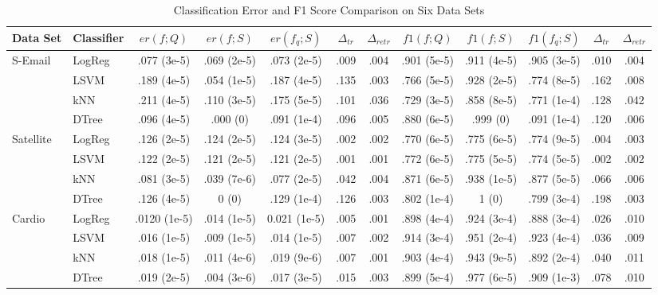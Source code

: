 \documentclass[10pt,a4paper,conference]{IEEEtran}
\begin{document}
\begin{table*}[t!]
\renewcommand{\arraystretch}{1.3} 
\caption{Classification Error and F1 Score Comparison on Six Data Sets}
\centering
\begin{threeparttable}
\setlength{\tabcolsep}{0.35em}
\begin{tabular}{llccccc|ccccc} %
\bf Data Set & \bf Classifier 
& $er(f; Q)$ & $er(f; S)$ & $er(f_{q}; S)$ &  $\Delta_{tr}$ & $\Delta_{retr}$ 
& $f1(f; Q)$ & $f1(f; S)$ & $f1(f_{q}; S)$ &  $\Delta_{tr}$ & $\Delta_{retr}$ \\ \hline 
S-Email & LogReg & .077 (3e-5) & .069 (2e-5) & .073 (2e-5) & .009 & .004  
& .901 (5e-5) & .911 (4e-5) & .905 (3e-5) & .010 & .004  \\ 
\ & LSVM & .189 (4e-5) & .054 (1e-5) & .187 (4e-5) & .135 & .003  
& .766 (5e-5)  & .928 (2e-5) & .774 (8e-5) & .162 & .008   \\ 
\ & kNN & .211 (4e-5) & .110 (3e-5) & .175 (5e-5) & .101 & .036 
& .729 (3e-5) & .858 (8e-5) & .771 (1e-4) & .128 & .042  \\ 
\ & DTree & .096 (4e-5) & .000 (0) & .091 (1e-4) & .096 & .005  
& .880 (6e-5) & .999 (0) & .091 (1e-4) & .120 & .006   \\ \hline 
Satellite & LogReg & .126 (2e-5) & .124 (2e-5) & .124 (3e-5) & .002 & .002  
& .770 (6e-5) & .775 (6e-5) & .774 (9e-5) & .004 & .003  \\  
\ & LSVM & .122 (2e-5) & .121 (2e-5) & .121 (2e-5) & .001 & .001 
& .772 (6e-5) & .775 (5e-5) & .774 (5e-5) & .002 & .002   \\ 
\ & kNN & .081 (3e-5) & .039 (7e-6) & .077 (2e-5) & .042 & .004   
& .871 (6e-5) & .938 (1e-5) & .877 (5e-5) & .066 & .006   \\ 
\ & DTree & .126 (4e-5) & 0 (0) & .129 (1e-4) & .126 & .003  
& .802 (1e-4) & 1 (0) & .799 (3e-4) & .198 & .003   \\ \hline 
Cardio & LogReg & .0120 (1e-5) & .014 (1e-5) & 0.021 (1e-5) & .005 & .001  
& .898 (4e-4) & .924 (3e-4) & .888 (3e-4) & .026 & .010 \\ 
\ & LSVM & .016  (1e-5) & .009 (1e-5) & .014 (1e-5) & .007 & .002
& .914 (3e-4) & .951 (2e-4) & .923 (4e-4) & .036 & .009  \\ 
\ & kNN & .018 (1e-5) & .011 (4e-6) & .019 (9e-6) & .007 & .001 
& .903 (4e-4) & .943 (9e-5) & .892 (2e-4) & .040 & .011 \\ 
\ & DTree & .019 (2e-5) & .004  (3e-6) & .017 (3e-5) & .015 & .003  
& .899 (5e-4) & .977 (6e-5) & .909 (1e-3) & .078 & .010 \\ \hline 

\end{tabular}
\end{threeparttable}
\end{table*}
\end{document}
